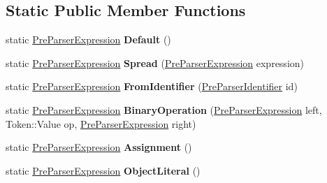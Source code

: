 \subsection*{Static Public Member Functions}
\begin{DoxyCompactItemize}
\item 
static \hyperlink{classv8_1_1internal_1_1_pre_parser_expression}{Pre\+Parser\+Expression} {\bfseries Default} ()\hypertarget{classv8_1_1internal_1_1_pre_parser_expression_aac26f7ed92596ab9c1ebd6a725ca006f}{}\label{classv8_1_1internal_1_1_pre_parser_expression_aac26f7ed92596ab9c1ebd6a725ca006f}

\item 
static \hyperlink{classv8_1_1internal_1_1_pre_parser_expression}{Pre\+Parser\+Expression} {\bfseries Spread} (\hyperlink{classv8_1_1internal_1_1_pre_parser_expression}{Pre\+Parser\+Expression} expression)\hypertarget{classv8_1_1internal_1_1_pre_parser_expression_ac7e9fe356aa9ce3ea6dbc87aeaf640ba}{}\label{classv8_1_1internal_1_1_pre_parser_expression_ac7e9fe356aa9ce3ea6dbc87aeaf640ba}

\item 
static \hyperlink{classv8_1_1internal_1_1_pre_parser_expression}{Pre\+Parser\+Expression} {\bfseries From\+Identifier} (\hyperlink{classv8_1_1internal_1_1_pre_parser_identifier}{Pre\+Parser\+Identifier} id)\hypertarget{classv8_1_1internal_1_1_pre_parser_expression_a094ce423be74c322228d6c1e05e1499a}{}\label{classv8_1_1internal_1_1_pre_parser_expression_a094ce423be74c322228d6c1e05e1499a}

\item 
static \hyperlink{classv8_1_1internal_1_1_pre_parser_expression}{Pre\+Parser\+Expression} {\bfseries Binary\+Operation} (\hyperlink{classv8_1_1internal_1_1_pre_parser_expression}{Pre\+Parser\+Expression} left, Token\+::\+Value op, \hyperlink{classv8_1_1internal_1_1_pre_parser_expression}{Pre\+Parser\+Expression} right)\hypertarget{classv8_1_1internal_1_1_pre_parser_expression_a5bc38e6a3ad74797e513971dda06750d}{}\label{classv8_1_1internal_1_1_pre_parser_expression_a5bc38e6a3ad74797e513971dda06750d}

\item 
static \hyperlink{classv8_1_1internal_1_1_pre_parser_expression}{Pre\+Parser\+Expression} {\bfseries Assignment} ()\hypertarget{classv8_1_1internal_1_1_pre_parser_expression_a1b712de1c3a80b67026e04b110bf2f96}{}\label{classv8_1_1internal_1_1_pre_parser_expression_a1b712de1c3a80b67026e04b110bf2f96}

\item 
static \hyperlink{classv8_1_1internal_1_1_pre_parser_expression}{Pre\+Parser\+Expression} {\bfseries Object\+Literal} ()\hypertarget{classv8_1_1internal_1_1_pre_parser_expression_ac4f5c740ea0daec5556f8e806aa01e39}{}\label{classv8_1_1internal_1_1_pre_parser_expression_ac4f5c740ea0daec5556f8e806aa01e39}


\end{DoxyCompactItemize}
